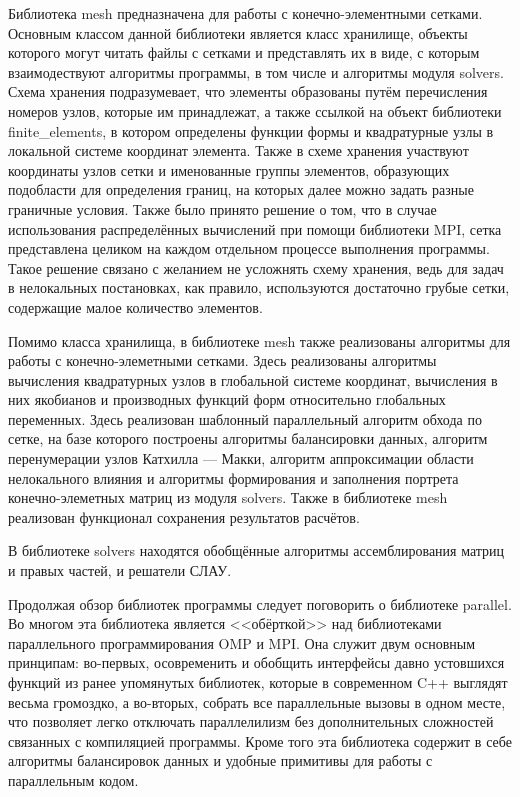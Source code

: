 Библиотека mesh предназначена для работы с конечно-элементными сетками. Основным классом данной библиотеки является класс хранилище, объекты которого могут читать файлы с сетками и представлять их в виде, с которым взаимодествуют алгоритмы программы, в том числе и алгоритмы модуля solvers. Схема хранения подразумевает, что элементы образованы путём перечисления номеров узлов, которые им принадлежат, а также ссылкой на объект библиотеки finite\_elements, в котором определены функции формы и квадратурные узлы в локальной системе координат элемента. Также в схеме хранения участвуют координаты узлов сетки и именованные группы элементов, образующих подобласти для определения границ, на которых далее можно задать разные граничные условия. Также было принято решение о том, что в случае использования распределённых вычислений при помощи библиотеки MPI, сетка представлена целиком на каждом отдельном процессе выполнения программы. Такое решение связано с желанием не усложнять схему хранения, ведь для задач в нелокальных постановках, как правило, используются достаточно грубые сетки, содержащие малое количество элементов.

Помимо класса хранилища, в библиотеке mesh также реализованы алгоритмы для работы с конечно-элеметными сетками. Здесь реализованы алгоритмы вычисления квадратурных узлов в глобальной системе координат, вычисления в них якобианов и производных функций форм относительно глобальных переменных. Здесь реализован шаблонный параллельный алгоритм обхода по сетке, на базе которого построены алгоритмы балансировки данных, алгоритм перенумерации узлов Катхилла --- Макки, алгоритм аппроксимации области нелокального влияния и алгоритмы формирования и заполнения портрета конечно-элеметных матриц из модуля solvers. Также в библиотеке mesh реализован функционал сохранения результатов расчётов.

В библиотеке solvers находятся обобщённые алгоритмы ассемблирования матриц и правых частей, и решатели СЛАУ.

Продолжая обзор библиотек программы следует поговорить о библиотеке parallel. Во многом эта библиотека является <<обёрткой>> над библиотеками параллельного программирования OMP и MPI. Она служит двум основным принципам: во-первых, осовременить и обобщить интерфейсы давно устовшихся функций из ранее упомянутых библиотек, которые в современном C++ выглядят весьма громоздко, а во-вторых, собрать все параллельные вызовы в одном месте, что позволяет легко отключать параллелилизм без дополнительных сложностей связанных с компиляцией программы. Кроме того эта библиотека содержит в себе алгоритмы балансировок данных и удобные примитивы для работы с параллельным кодом.

